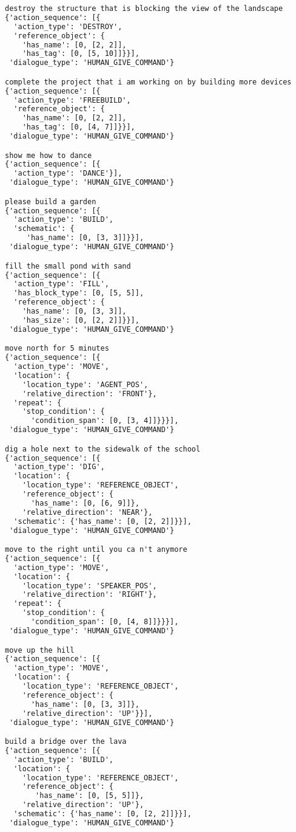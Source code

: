 \begin{lstlisting}[language=TeX]
destroy the structure that is blocking the view of the landscape
{'action_sequence': [{
  'action_type': 'DESTROY',
  'reference_object': {
    'has_name': [0, [2, 2]],
    'has_tag': [0, [5, 10]]}}],
 'dialogue_type': 'HUMAN_GIVE_COMMAND'}

complete the project that i am working on by building more devices
{'action_sequence': [{
  'action_type': 'FREEBUILD',
  'reference_object': {
    'has_name': [0, [2, 2]],
    'has_tag': [0, [4, 7]]}}],
 'dialogue_type': 'HUMAN_GIVE_COMMAND'}

show me how to dance
{'action_sequence': [{
  'action_type': 'DANCE'}],
 'dialogue_type': 'HUMAN_GIVE_COMMAND'}

please build a garden
{'action_sequence': [{
  'action_type': 'BUILD',
  'schematic': {
     'has_name': [0, [3, 3]]}}],
 'dialogue_type': 'HUMAN_GIVE_COMMAND'}

fill the small pond with sand
{'action_sequence': [{
  'action_type': 'FILL',
  'has_block_type': [0, [5, 5]],
  'reference_object': {
    'has_name': [0, [3, 3]],
    'has_size': [0, [2, 2]]}}],
 'dialogue_type': 'HUMAN_GIVE_COMMAND'}

move north for 5 minutes
{'action_sequence': [{
  'action_type': 'MOVE',
  'location': {
    'location_type': 'AGENT_POS',
    'relative_direction': 'FRONT'},
  'repeat': {
    'stop_condition': {
      'condition_span': [0, [3, 4]]}}}],
 'dialogue_type': 'HUMAN_GIVE_COMMAND'}

dig a hole next to the sidewalk of the school
{'action_sequence': [{
  'action_type': 'DIG',
  'location': {
    'location_type': 'REFERENCE_OBJECT',
    'reference_object': {
      'has_name': [0, [6, 9]]},
    'relative_direction': 'NEAR'},
  'schematic': {'has_name': [0, [2, 2]]}}],
 'dialogue_type': 'HUMAN_GIVE_COMMAND'}

move to the right until you ca n't anymore
{'action_sequence': [{
  'action_type': 'MOVE',
  'location': {
    'location_type': 'SPEAKER_POS',
    'relative_direction': 'RIGHT'},
  'repeat': {
    'stop_condition': {
      'condition_span': [0, [4, 8]]}}}],
 'dialogue_type': 'HUMAN_GIVE_COMMAND'}

move up the hill
{'action_sequence': [{
  'action_type': 'MOVE',
  'location': {
    'location_type': 'REFERENCE_OBJECT',
    'reference_object': {
      'has_name': [0, [3, 3]]},
    'relative_direction': 'UP'}}],
 'dialogue_type': 'HUMAN_GIVE_COMMAND'}

build a bridge over the lava
{'action_sequence': [{
  'action_type': 'BUILD',
  'location': {
    'location_type': 'REFERENCE_OBJECT',
    'reference_object': {
       'has_name': [0, [5, 5]]},
    'relative_direction': 'UP'},
  'schematic': {'has_name': [0, [2, 2]]}}],
 'dialogue_type': 'HUMAN_GIVE_COMMAND'}


\end{lstlisting}
